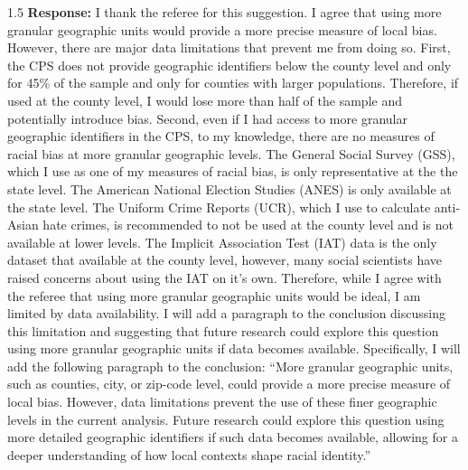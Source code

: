 \documentclass[12pt,english]{article}
\newcommand{\rrxspc}{1.5}
\begin{document}
\begin{refsection}
    \begin{spacing}{\rrxspc}
            \textbf{Response:} I thank the referee for this suggestion. I agree that using more granular geographic units would provide a more precise measure of local bias. However, there are major data limitations that prevent me from doing so. First, the CPS does not provide geographic identifiers below the county level and only for 45\% of the sample and only for counties with larger populations. Therefore, if used at the county level, I would lose more than half of the sample and potentially introduce bias. Second, even if I had access to more granular geographic identifiers in the CPS, to my knowledge, there are no measures of racial bias at more granular geographic levels. The General Social Survey (GSS), which I use as one of my measures of racial bias, is only representative at the the state level. The American National Election Studies (ANES) is only available at the state level. The Uniform Crime Reports (UCR), which I use to calculate anti-Asian hate crimes, is recommended to not be used at the county level and is not available at lower levels. The Implicit Association Test (IAT) data is the only dataset that available at the county level, however, many social scientists have raised concerns about using the IAT on it's own. Therefore, while I agree with the referee that using more granular geographic units would be ideal, I am limited by data availability. I will add a paragraph to the conclusion discussing this limitation and suggesting that future research could explore this question using more granular geographic units if data becomes available. Specifically, I will add the following paragraph to the conclusion: ``More granular geographic units, such as counties, city, or zip-code level, could provide a more precise measure of local bias. However, data limitations prevent the use of these finer geographic levels in the current analysis. Future research could explore this question using more detailed geographic identifiers if such data becomes available, allowing for a deeper understanding of how local contexts shape racial identity.''


\end{spacing}
\end{refsection}
\end{document}
